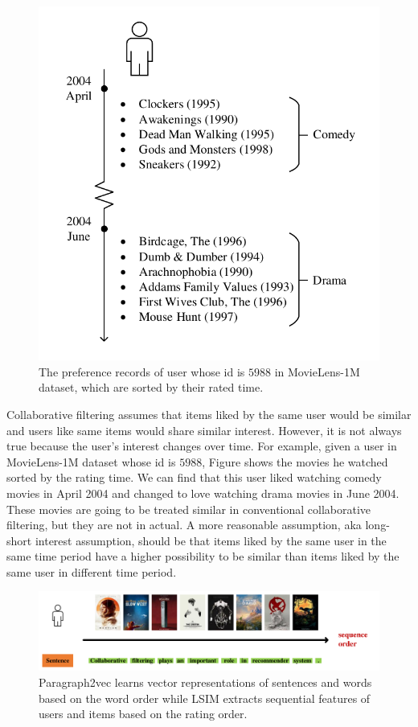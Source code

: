 \documentclass{llncs}
\begin{document}
\begin{figure}[htbp]
	\centering
	\includegraphics[scale=0.5]{images/example.pdf}
	\caption{The preference records of user whose id is $5988$ in MovieLens-1M dataset,
		which are sorted by their rated time.}
	\label{fig:example}
\end{figure}

Collaborative filtering assumes that items liked by the same user would be similar and
users like same items would share similar interest.
However, it is not always true because the user's interest changes over time.
For example, given a user in MovieLens-1M dataset whose id is $5988$,
Figure \label{fig:example} shows the movies he watched sorted by the rating time.
We can find that this user liked watching comedy movies in April 2004 and
changed to love watching drama movies in June 2004.
These movies are going to be treated similar in conventional collaborative filtering,
but they are not in actual.
A more reasonable assumption, aka long-short interest assumption, should be that
items liked by the same user in the same time period have a higher possibility
to be similar than items liked by the same user in different time period.

\begin{figure}[htbp]
	\centering
	\includegraphics[scale=0.3]{images/example2.pdf}
	\caption{Paragraph2vec learns vector representations of sentences and words
		based on the word order
		while LSIM extracts sequential features of users and items
		based on the rating order.
	}
	\label{fig:example2}
\end{figure}
\end{document}
